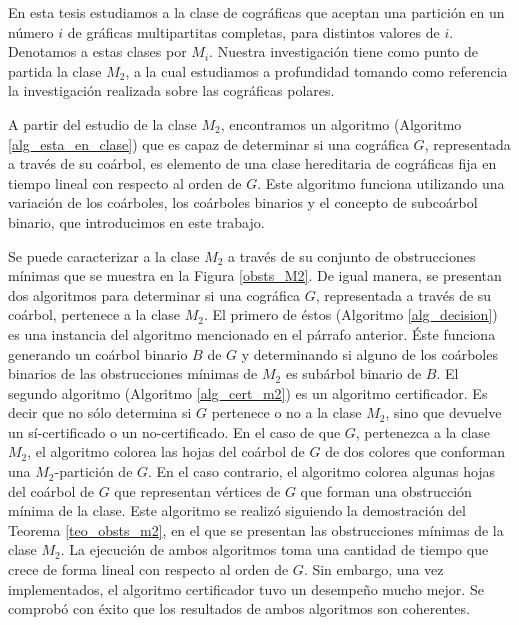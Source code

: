En esta tesis estudiamos a la clase de cográficas que aceptan una partición en un número $i$ de gráficas multipartitas completas, para distintos valores de $i$. Denotamos a estas clases por $M_i$. Nuestra investigación tiene como punto de partida la clase $M_2$, a la cual estudiamos a profundidad tomando como referencia la investigación realizada sobre las cográficas polares.

A partir del estudio de la clase $M_2$, encontramos un algoritmo (Algoritmo \ref{alg_esta_en_clase}) que es capaz de determinar si una cográfica $G$, representada a través de su coárbol, es elemento de una clase hereditaria de cográficas fija en tiempo lineal con respecto al orden de $G$. Este algoritmo funciona utilizando una variación de los coárboles, los coárboles binarios y el concepto de subcoárbol binario,
que introducimos en este trabajo.

Se puede caracterizar a la clase $M_2$ a través de su conjunto de obstrucciones mínimas que se muestra en la Figura \ref{obsts_M2}. De igual manera, se presentan dos algoritmos para determinar si una cográfica $G$, representada a través de su coárbol, pertenece a la clase $M_2$. El primero de \'estos (Algoritmo \ref{alg_decision}) es una instancia del algoritmo mencionado en el párrafo anterior. Éste funciona generando un coárbol binario $B$ de $G$ y determinando si alguno de los coárboles binarios de las obstrucciones mínimas de $M_2$ es subárbol binario de $B$. El segundo algoritmo (Algoritmo \ref{alg_cert_m2}) es un algoritmo certificador. Es decir que no sólo determina si $G$ pertenece o no a la clase $M_2$, sino que devuelve un sí-certificado o un no-certificado. En el caso de que $G$, pertenezca a la clase $M_2$, el algoritmo colorea las hojas del coárbol de $G$ de dos colores que conforman una $M_2$-partición de $G$. En el caso contrario, el algoritmo colorea algunas hojas del coárbol de $G$ que representan vértices de $G$ que forman una obstrucción mínima de la clase. Este algoritmo se realizó siguiendo la demostración del Teorema \ref{teo_obsts_m2}, en el que se presentan las obstrucciones mínimas de la clase $M_2$. La ejecución de ambos algoritmos toma una cantidad de tiempo que crece de forma lineal con respecto al orden de $G$. Sin embargo, una vez implementados, el algoritmo certificador tuvo un desempeño mucho mejor. Se comprobó con éxito que los resultados de ambos algoritmos son coherentes.

